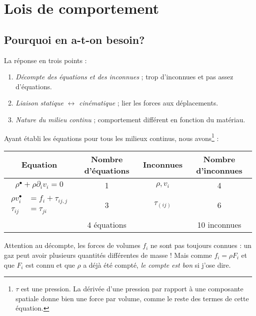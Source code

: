 \chapter{Lois de comportement}
\label{ch:ch5}

\section{Pourquoi en a-t-on besoin?}
La réponse en trois points :
\begin{enumerate}
	\item \textit{Décompte des équations et des inconnues} ; trop d'inconnues et pas assez d'équations.
	\item \textit{Liaison statique $\leftrightarrow$ cinématique} ; lier les forces aux déplacements.
	\item \textit{Nature du milieu continu} ; comportement différent en fonction du matériau.
\end{enumerate}
Ayant établi les équations pour tous les milieux continus, nous avons\footnote{$\tau$ est une 
	pression. La dérivée d'une pression par rapport à une composante spatiale donne bien une force par
volume, comme le reste des termes de cette équation.} :

\begin{center}
	\begin{tabular}{|c|c|c|c|}
		\hline
		\textbf{Equation}                       & \textbf{Nombre d'équations} & \textbf{Inconnues} & \textbf{Nombre 
		d'inconnues}\\
		\hline
		$\rho^\bullet + \rho\partial_i v_i = 0$ & 1                            & $\rho,v_i$         & 4              \\
		\hline
		$\begin{array}{ll}
		\rho v_i^\bullet &= f_i + \tau_{ij,j}\\
		\tau_{ij} &= \tau_{ji}
		\end{array}$                            & 3                            & $\tau_{(ij)}$      & 6              \\
		\hline
		                                        & 4 équations                 &                    & 10 inconnues   \\
		\hline
	\end{tabular}
\end{center}
Attention au décompte, les forces de volumes $f_i$ ne sont pas toujours connues : un gaz peut
avoir plusieurs quantités différentes de masse ! Mais comme $f_i = \rho F_i$ et que $F_i$ est
connu et que $\rho$ a déjà été compté, \textit{le compte est bon} si j'ose dire.\\

